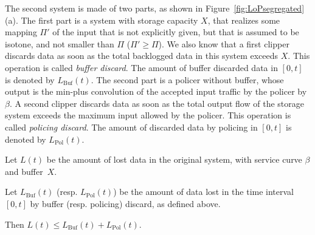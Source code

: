 The second system is made of two parts, as shown in
Figure~\ref{fig:LoPsegregated}(a). The first part is a  system
with storage capacity $X$, that realizes some mapping $\Pi'$ of
the input that is not explicitly given, but that is assumed to be
isotone, and not smaller than $\Pi$
 ($\Pi' \geq \Pi$).
We also know that a first clipper discards data as soon as the
total backlogged data in this system exceeds $X$. This operation
is called {\em buffer discard}. The amount of buffer discarded
data in $[0,t]$ is denoted by $L_{\mathrm{Buf}}(t)$. The second
part is a policer without buffer, whose output is the min-plus
convolution of the accepted input traffic by the policer by
$\beta$. A second clipper discards data as soon as the total
output flow of the storage system exceeds the maximum input
allowed by the policer. This operation is called {\em policing
discard}. The amount of discarded data by policing in $[0,t]$ is
denoted by $L_{\mathrm{Pol}}(t)$.

\begin{figure}[!h]
    \protect{}
\end{figure}

\begin{theorem} 
Let $L(t)$ be the amount of lost data in the original system, with service curve $\beta$
and buffer~$X$.

Let $L_{\mathrm{Buf}}(t)$ (resp. $L_{\mathrm{Pol}}(t)$) be the amount of data lost
in the time interval $[0,t]$ by buffer (resp. policing) discard, as defined above.

Then $L(t) \leq L_{\mathrm{Buf}}(t) + L_{\mathrm{Pol}}(t)$.
\end{theorem}


